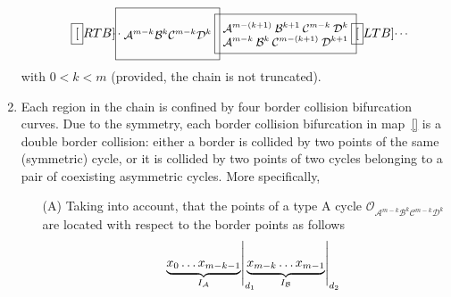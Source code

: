 \documentclass[12pt]{article}
\newcommand{\A}{{\mathcal A}}
\newcommand{\B}{{\mathcal B}}
\newcommand{\C}{{\mathcal C}}
\newcommand{\D}{{\mathcal D}}
\newcommand{\LC}{{\mathcal O}}
\begin{document}
\begin{enumerate}
        \begin{equation}
          \fbox[RTB]{
            \begin{minipage}[c][2.5em][c]{1ex}\small
              \hspace*{-.7em}\dots
            \end{minipage}
          }
          \hspace*{-1ex}
          \fbox{
            \begin{minipage}[c][3.5em][c]{7em}\small\centering
              $\A^{m-k}\:\B^k\:\C^{m-k}\:\D^k$
            \end{minipage}
          }
          \hspace*{-1ex}
          \fbox{
            \begin{minipage}[c][2.5em][c]{10em}\small\centering
              $\A^{m-(k+1)}\:\B^{k+1}\:\C^{m-k}    \:\D^{k}$\\
              $\A^{m-k}   \:\B^{k}  \:\C^{m-(k+1)}\:\D^{k+1}$
            \end{minipage}
          }
          \hspace*{-1ex}
          \fbox[LTB]{
            \begin{minipage}[c][3.5em][c]{1ex}\small
              \dots
            \end{minipage}
          }
        \end{equation}
        with $0<k<m$ (provided, the chain is not truncated).
  \item
        Each region in the chain is confined by four border collision
        bifurcation curves. Due to the symmetry, each border collision bifurcation
        in map~\eqref{} is a double border collision: either a
        border is collided by two points of the same (symmetric) cycle,
        or it is collided by two points of two cycles belonging to a pair
        of coexisting asymmetric cycles. More specifically,
        \begin{itemize}
          \item[(A)]
            Taking into account, that the points of a type A cycle
            $\LC_{\A^{m-k}\B^k\C^{m-k}\D^k}$ are
            located with respect to the border points as follows
            \begin{equation}
              \left.
              \underbrace{x_0 \dots x_{m-k-1}}_{I_\A}
              \right|_{d_1}\hspace*{-1em}
              \left.
              \underbrace{x_{m-k} \dots x_{m-1}}_{I_\B}
              \right|_{d_2}\hspace*{-1em}

\end{equation}
\end{itemize}
\end{enumerate}
\end{document}
